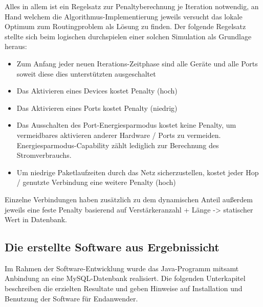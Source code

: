 Alles in allem ist ein Regelsatz zur Penaltyberechnung je Iteration notwendig, an Hand welchem die Algorithmus-Implementierung jeweils versucht das lokale Optimum zum Routingproblem als Lösung zu finden.
Der folgende Regelsatz stellte sich beim logischen durchspielen einer solchen Simulation als Grundlage heraus:
\begin{itemize}
	\item Zum Anfang jeder neuen Iterations-Zeitphase sind alle Geräte und alle Ports soweit diese dies unterstützten ausgeschaltet
	\item Das Aktivieren eines Devices kostet Penalty (hoch)
	\item Das Aktivieren eines Ports kostet Penalty (niedrig)
	\item Das Ausschalten des Port-Energiesparmodus kostet keine Penalty, um vermeidbares aktivieren anderer Hardware / Ports zu vermeiden. Energiesparmodus-Capability zählt lediglich zur Berechnung des Stromverbrauchs.
	\item Um niedrige Paketlaufzeiten durch das Netz sicherzustellen, kostet jeder Hop / genutzte Verbindung eine weitere Penalty (hoch)
\end{itemize}
Einzelne Verbindungen haben zusätzlich zu dem dynamischen Anteil außerdem jeweils eine feste Penalty basierend auf Verstärkeranzahl + Länge -> statischer Wert in Datenbank.



\subsection{Die erstellte Software aus Ergebnissicht}\label{subsec:ErgSoftware}
Im Rahmen der Software-Entwicklung wurde das Java-Programm  mitsamt Anbindung an eine MySQL-Datenbank realisiert. Die folgenden Unterkapitel beschreiben die erzielten Resultate und geben Hinweise auf Installation und Benutzung der Software für Endanwender.

